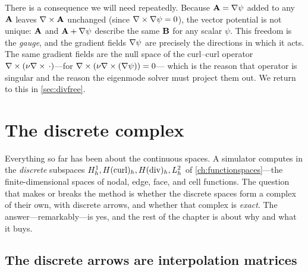 There is a consequence we will need repeatedly. Because $\mathbf{A}=\nabla\psi$ added to any
$\mathbf{A}$ leaves $\nabla\times\mathbf{A}$ unchanged (since $\nabla\times\nabla\psi=0$), the vector potential is
not unique: $\mathbf{A}$ and $\mathbf{A}+\nabla\psi$ describe the same $\mathbf{B}$ for any scalar $\psi$.
This freedom is the \emph{gauge}, and the gradient fields $\nabla\psi$ are precisely
the directions in which it acts. The same gradient fields are the null space of the
curl--curl operator $\nabla\times(\nu\nabla\times\,\cdot)$---for $\nabla\times(\nu\nabla\times(\nabla\psi))=0$---
which is the reason that operator is singular and the reason the eigenmode solver
must project them out. We return to this in \cref{sec:divfree}.

\section{The discrete complex}
\label{sec:discrete-arrows}

Everything so far has been about the continuous spaces. A simulator computes in the
\emph{discrete} subspaces $H^1_h,H(\mathrm{curl})_h,H(\mathrm{div})_h,L^2_h$ of
\cref{ch:functionspaces}---the finite-dimensional spaces of nodal, edge, face, and
cell functions. The question that makes or breaks the method is whether the discrete
spaces form a complex of their own, with discrete arrows, and whether that complex is
\emph{exact}. The answer---remarkably---is yes, and the rest of the chapter is about
why and what it buys.

\subsection{The discrete arrows are interpolation matrices}

